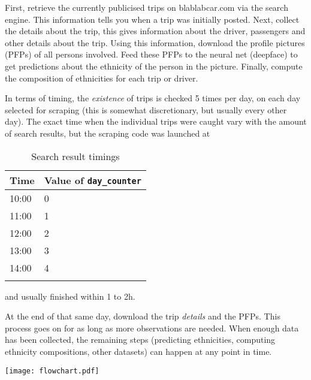 \documentclass[11pt,a4paper]{article}
\begin{document}
First, retrieve the currently publicised trips on blablabcar.com via the search engine. 
This information tells you when a trip was initially posted. 
Next, collect the details about the trip, this gives information about the driver, passengers and other details about the trip.
Using this information, download the profile pictures (PFPs) of all persons involved. 
Feed these PFPs to the neural net (deepface) to get predictions about the ethnicity of the person in the picture. 
Finally, compute the composition of ethnicities for each trip or driver. 

In terms of timing, the \textit{existence} of trips is checked 5 times per day, on each day selected for scraping (this is somewhat discretionary, but usually every other day).
The exact time when the individual trips were caught vary with the amount of search results, but the scraping code was launched at
\begin{longtable}{p{20mm}p{40mm}}
	\textbf{Time}	& \textbf{Value of} \verb|day_counter| \\\hline
	10:00			& 0 \\
	11:00			& 1 \\
	12:00			& 2 \\
	13:00			& 3 \\
	14:00			& 4	\\
\caption{Search result timings}
\label{tab:searchResultTimings}
\end{longtable}
\vspace{-10mm}
and usually finished within 1 to 2h.\footnotemark

At the end of that same day, download the trip \textit{details} and the PFPs.\footnotemark
This process goes on for as long as more observations are needed. 
When enough data has been collected, the remaining steps (predicting ethnicities, computing ethnicity compositions, other datasets) can happen at any point in time. 




\begin{landscape}
	\centering
	\texttt{[image: flowchart.pdf]}
\end{landscape}
\restoregeometry
\end{document}
